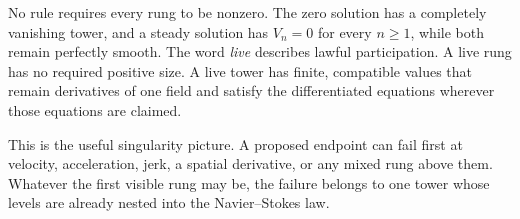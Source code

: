 No rule requires every rung to be nonzero.
The zero solution has a completely vanishing tower, and a steady solution has \(V_n=0\) for every \(n\geq1\), while both remain perfectly smooth.
The word \emph{live} describes lawful participation.
A live rung has no required positive size.
A live tower has finite, compatible values that remain derivatives of one field and satisfy the differentiated equations wherever those equations are claimed.

This is the useful singularity picture.
A proposed endpoint can fail first at velocity, acceleration, jerk, a spatial derivative, or any mixed rung above them.
Whatever the first visible rung may be, the failure belongs to one tower whose levels are already nested into the Navier--Stokes law.
